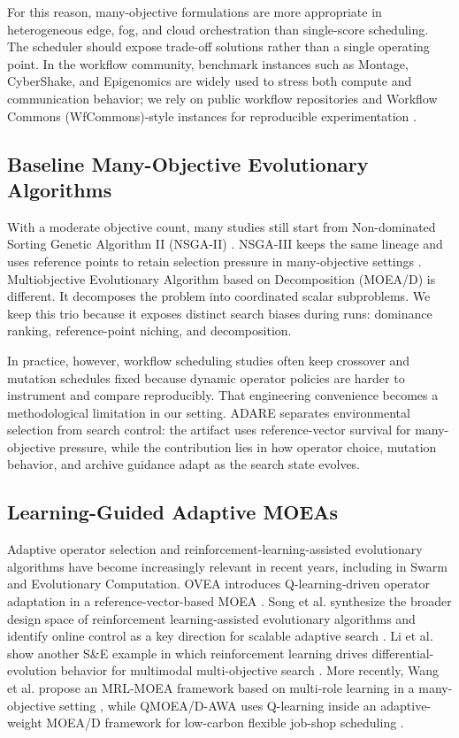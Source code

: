 \documentclass[runningheads]{llncs}
\begin{document}
For this reason, many-objective formulations are more appropriate in heterogeneous edge, fog, and cloud orchestration than single-score scheduling. The scheduler should expose trade-off solutions rather than a single operating point. In the workflow community, benchmark instances such as Montage, CyberShake, and Epigenomics are widely used to stress both compute and communication behavior; we rely on public workflow repositories and Workflow Commons (WfCommons)-style instances for reproducible experimentation \cite{coleman2021wfcommons}.

\subsection{Baseline Many-Objective Evolutionary Algorithms}
With a moderate objective count, many studies still start from Non-dominated Sorting Genetic Algorithm II (NSGA-II) \cite{deb2002nsga2}. NSGA-III keeps the same lineage and uses reference points to retain selection pressure in many-objective settings \cite{deb2014nsga3}. Multiobjective Evolutionary Algorithm based on Decomposition (MOEA/D) \cite{zhang2007moead} is different. It decomposes the problem into coordinated scalar subproblems. We keep this trio because it exposes distinct search biases during runs: dominance ranking, reference-point niching, and decomposition.

In practice, however, workflow scheduling studies often keep crossover and mutation schedules fixed because dynamic operator policies are harder to instrument and compare reproducibly. That engineering convenience becomes a methodological limitation in our setting. ADARE separates environmental selection from search control: the artifact uses reference-vector survival for many-objective pressure, while the contribution lies in how operator choice, mutation behavior, and archive guidance adapt as the search state evolves.

\subsection{Learning-Guided Adaptive MOEAs}
Adaptive operator selection and reinforcement-learning-assisted evolutionary algorithms have become increasingly relevant in recent years, including in Swarm and Evolutionary Computation. OVEA introduces Q-learning-driven operator adaptation in a reference-vector-based MOEA \cite{jiao2023ovea}. Song et al. synthesize the broader design space of reinforcement learning-assisted evolutionary algorithms and identify online control as a key direction for scalable adaptive search \cite{song2024survey}. Li et al. show another S\&E example in which reinforcement learning drives differential-evolution behavior for multimodal multi-objective search \cite{li2019derlfr}. More recently, Wang et al. propose an MRL-MOEA framework based on multi-role learning in a many-objective setting \cite{wang2025mrlmoea}, while QMOEA/D-AWA uses Q-learning inside an adaptive-weight MOEA/D framework for low-carbon flexible job-shop scheduling \cite{wang2026qmoeadawa}.
\end{document}

